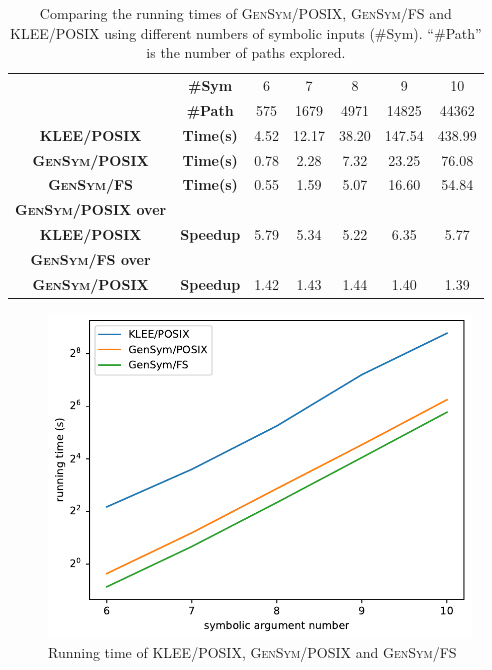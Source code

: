 \documentclass[sigplan, nonacm]{acmart}\settopmatter{printfolios=true,printccs=false,printacmref=false}
\newcommand{\tool}{\textsc{GenSym}\xspace}
\begin{document}
\begin{table}[h]
  \vspace{-0.75em}
  \footnotesize
\caption{Comparing the running times of \tool/POSIX, \tool/FS and KLEE/POSIX
  using different numbers of symbolic inputs (\#Sym).
  ``\#Path'' is the number of paths explored.}
  \vspace{-0.75em}
\begin{tabular}{c|cccccc}

  \hline
                & \textbf{\#Sym}    & 6     & 7     & 8    & 9     & 10      \\
                & \textbf{\#Path}   & 575     & 1679    & 4971  & 14825  & 44362      \\
                 \hline
  \textbf{KLEE/POSIX} &\textbf{Time(s)} & 4.52  & 12.17  & 38.20 & 147.54  & 438.99   \\
  \textbf{\tool/POSIX}& \textbf{Time(s)}  & 0.78 & 2.28 & 7.32 & 23.25 & 76.08 \\
  \textbf{\tool/FS}   &\textbf{Time(s)}  & 0.55 & 1.59 & 5.07 & 16.60  & 54.84  \\
                 \hline
  \textbf{\tool/POSIX over}   &  \\
  \textbf{KLEE/POSIX}   &\textbf{Speedup}  & 5.79 & 5.34 & 5.22 & 6.35  & 5.77  \\
  \hline
  \textbf{\tool/FS over}   &  \\
  \textbf{\tool/POSIX}   &\textbf{Speedup}  & 1.42 & 1.43 & 1.44 & 1.40  & 1.39  \\
  \hline
  \end{tabular}
\label{tab:coreutils_benchmarks_echo}
\vspace{-1em}
\end{table}
\begin{figure}[htbp]
  \centering
  \includegraphics[scale=0.6]{evaluationplot.pdf}
  \caption{Running time of KLEE/POSIX, \tool/POSIX and \tool/FS}
  \label{fig:speedup}
\end{figure}
\end{document}
